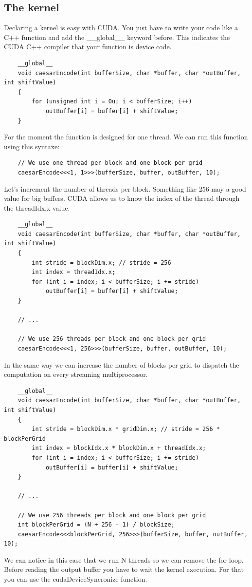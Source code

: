 \documentclass{article}
\begin{document}
\subsection{The kernel}
	Declaring a kernel is easy with CUDA. You just have to write your code like a C++ function and add the \_\_global\_\_ keyword before. This indicates the CUDA C++ compiler that your function is device code. 
\begin{lstlisting}
	__global__
	void caesarEncode(int bufferSize, char *buffer, char *outBuffer, int shiftValue)
	{
		for (unsigned int i = 0u; i < bufferSize; i++)
			outBuffer[i] = buffer[i] + shiftValue;
	}
\end{lstlisting}
For the moment the function is designed for one thread. We can run this function using this syntaxe:
\begin{lstlisting}
	// We use one thread per block and one block per grid
	caesarEncode<<<1, 1>>>(bufferSize, buffer, outBuffer, 10);
\end{lstlisting}
Let's increment the number of threads per block. Something like 256 may a good value for big buffers. CUDA allows us to know the index of the thread through the threadIdx.x value. 

\begin{lstlisting}
	__global__
	void caesarEncode(int bufferSize, char *buffer, char *outBuffer, int shiftValue)
	{
		int stride = blockDim.x; // stride = 256
		int index = threadIdx.x;
		for (int i = index; i < bufferSize; i += stride)
			outBuffer[i] = buffer[i] + shiftValue;
	}
	
	// ...

	// We use 256 threads per block and one block per grid
	caesarEncode<<<1, 256>>>(bufferSize, buffer, outBuffer, 10);
\end{lstlisting}

In the same way we can increase the number of blocks per grid to dispatch the computation on every streaming multiprocessor.
\begin{lstlisting}
	__global__
	void caesarEncode(int bufferSize, char *buffer, char *outBuffer, int shiftValue)
	{
		int stride = blockDim.x * gridDim.x; // stride = 256 * blockPerGrid
		int index = blockIdx.x * blockDim.x + threadIdx.x;
		for (int i = index; i < bufferSize; i += stride)
			outBuffer[i] = buffer[i] + shiftValue;
	}
	
	// ...

	// We use 256 threads per block and one block per grid
	int blockPerGrid = (N + 256 - 1) / blockSize;
	caesarEncode<<<blockPerGrid, 256>>>(bufferSize, buffer, outBuffer, 10);
\end{lstlisting}
We can notice in this case that we run N threads so we can remove the for loop. Before reading the output buffer you have to wait the kernel execution. For that you can use the cudaDeviceSyncronize function.
\end{document}
